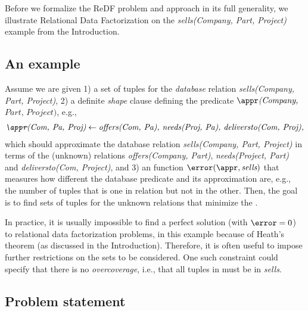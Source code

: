 
Before we formalize the ReDF problem and approach in its full generality, we illustrate Relational Data Factorization on the \textit{sells(Company, Part, Project)} example from the Introduction.

\subsection{An example}

Assume we are given 1) a set of tuples for the {\em database} relation \textit{sells(Company, Part, Project)},
2) a definite {\em shape} clause defining the predicate $\appr\textit{(Company,}$ $\textit{Part, Project)}$, e.g.,
\begin{align*}
 \textit{\appr(Com, Pa, Proj)} \leftarrow \textit{offers(Com, Pa), needs(Proj, Pa), deliversto(Com, Proj),}
\end{align*}
 which should approximate the database relation \textit{sells(Company, Part, Project)} in
 terms of the (unknown) relations \textit{offers(Company, Part)}, \textit{needs(Project, Part)} and \textit{deliversto(Com, Project)},
 and
3)   an   \error function $\error(\appr, \textit{sells})$ that measures how 
different the database predicate 
and its approximation are, e.g., the number of tuples that is one in relation but not in the other. 
Then, the goal is to find sets of tuples for the unknown relations that minimize the \error. 

In practice, it is usually impossible to find a perfect solution (with $\error=0$) to relational data factorization problems, in this example because of Heath's theorem \parencite{heath_theorem} (as discussed in the Introduction). Therefore, it is often useful to impose further restrictions on the sets to be considered. One such constraint could specify that there is no {\em overcoverage}, i.e., that all tuples in \appr must be in \textit{sells}.

\subsection{Problem statement}

